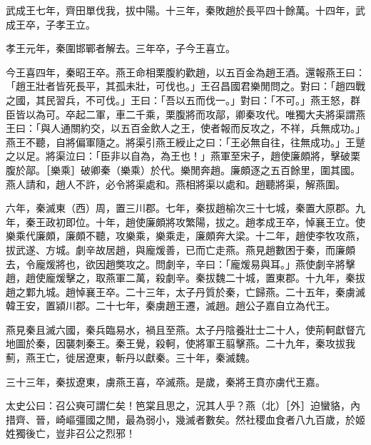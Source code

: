 \begin{pinyinscope}
武成王七年，齊田單伐我，拔中陽。十三年，秦敗趙於長平四十餘萬。十四年，武成王卒，子孝王立。

孝王元年，秦圍邯鄲者解去。三年卒，子今王喜立。

今王喜四年，秦昭王卒。燕王命相栗腹約歡趙，以五百金為趙王酒。還報燕王曰：「趙王壯者皆死長平，其孤未壯，可伐也。」王召昌國君樂閒問之。對曰：「趙四戰之國，其民習兵，不可伐。」王曰：「吾以五而伐一。」對曰：「不可。」燕王怒，群臣皆以為可。卒起二軍，車二千乘，栗腹將而攻鄗，卿秦攻代。唯獨大夫將渠謂燕王曰：「與人通關約交，以五百金飲人之王，使者報而反攻之，不祥，兵無成功。」燕王不聽，自將偏軍隨之。將渠引燕王綬止之曰：「王必無自往，往無成功。」王蹵之以足。將渠泣曰：「臣非以自為，為王也！」燕軍至宋子，趙使廉頗將，擊破栗腹於鄗。［樂乘］破卿秦（樂乘）於代。樂閒奔趙。廉頗逐之五百餘里，圍其國。燕人請和，趙人不許，必令將渠處和。燕相將渠以處和。趙聽將渠，解燕圍。

六年，秦滅東（西）周，置三川郡。七年，秦拔趙榆次三十七城，秦置大原郡。九年，秦王政初即位。十年，趙使廉頗將攻繁陽，拔之。趙孝成王卒，悼襄王立。使樂乘代廉頗，廉頗不聽，攻樂乘，樂乘走，廉頗奔大梁。十二年，趙使李牧攻燕，拔武遂、方城。劇辛故居趙，與龐煖善，已而亡走燕。燕見趙數困于秦，而廉頗去，令龐煖將也，欲因趙獘攻之。問劇辛，辛曰：「龐煖易與耳。」燕使劇辛將擊趙，趙使龐煖擊之，取燕軍二萬，殺劇辛。秦拔魏二十城，置東郡。十九年，秦拔趙之鄴九城。趙悼襄王卒。二十三年，太子丹質於秦，亡歸燕。二十五年，秦虜滅韓王安，置潁川郡。二十七年，秦虜趙王遷，滅趙。趙公子嘉自立為代王。

燕見秦且滅六國，秦兵臨易水，禍且至燕。太子丹陰養壯士二十人，使荊軻獻督亢地圖於秦，因襲刺秦王。秦王覺，殺軻，使將軍王翦擊燕。二十九年，秦攻拔我薊，燕王亡，徙居遼東，斬丹以獻秦。三十年，秦滅魏。

三十三年，秦拔遼東，虜燕王喜，卒滅燕。是歲，秦將王賁亦虜代王嘉。

太史公曰：召公奭可謂仁矣！笆棠且思之，況其人乎？燕（北）［外］迫蠻貉，內措齊、晉，崎嶇彊國之閒，最為弱小，幾滅者數矣。然社稷血食者八九百歲，於姬姓獨後亡，豈非召公之烈邪！


\end{pinyinscope}